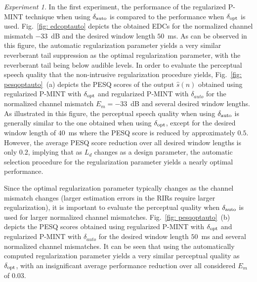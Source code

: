 \documentclass{article}
\begin{document}
\smallskip \noindent \textit{Experiment 1.} \enspace
In the first experiment, the performance of the regularized P-MINT technique when using $\delta_{\rm auto}$ is compared to the performance when $\delta_{\rm opt}$ is used. 
Fig.~\ref{fig: edcoptauto} depicts the obtained EDCs for the normalized channel mismatch $-33$~dB and the desired window length $50$~ms. 
As can be observed in this figure, the automatic regularization parameter yields a very similar reverberant tail suppression as the optimal regularization parameter, with the reverberant tail being below audible levels.
In order to evaluate the perceptual speech quality that the non-intrusive regularization procedure yields, Fig.~\ref{fig: pesqoptauto}~(a) depicts the PESQ scores of the output $\hat{s}(n)$ obtained using regularized P-MINT with $\delta_{\rm opt}$ and regularized P-MINT with $\delta_{auto}$ for the normalized channel mismatch $E_m = -33$~dB and several desired window lengths.
As illustrated in this figure, the perceptual speech quality when using $\delta_{\rm auto}$ is generally similar to the one obtained when using $\delta_{\rm opt}$, except for the desired window length of $40$~ms where the PESQ score is reduced by approximately $0.5$. 
However, the average PESQ score reduction over all desired window lengths is only $0.2$, implying that as $L_d$ changes as a design parameter, the automatic selection procedure for the regularization parameter yields a nearly optimal performance. 

Since the optimal regularization parameter typically changes as the channel mismatch changes (larger estimation errors in the RIRs require larger regularization), it is important to evaluate the perceptual quality when $\delta_{\rm auto}$ is used for larger normalized channel mismatches.
Fig.~\ref{fig: pesqoptauto}~(b) depicts the PESQ scores obtained using regularized P-MINT with $\delta_{\rm opt}$ and regularized P-MINT with $\delta_{auto}$ for the desired window length $50$~ms and several normalized channel mismatches.
It can be seen that using the automatically computed regularization parameter yields a very similar perceptual quality as $\delta_{\rm opt}$, with an insignificant average performance reduction over all considered $E_m$ of $0.03$.
\end{document}
